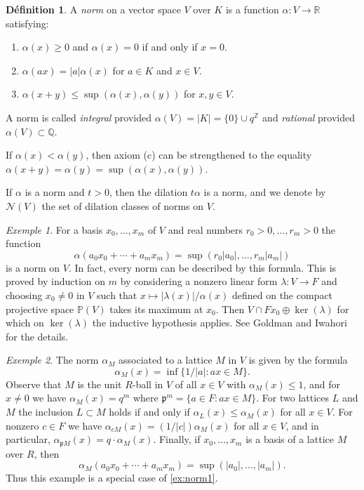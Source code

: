 \documentclass[12pt,a4paper]{article}
\theoremstyle{plain}
\theoremstyle{definition}
\newtheorem{definition}{D\'efinition}[section]
\theoremstyle{remark}
\newtheorem{example}{Exemple}[section]
\newcommand{\fp}{\mathfrak{p}}
\newcommand{\bQ}{\mathbb{Q}}
\newcommand{\bZ}{\mathbb{Z}}
\newcommand{\bP}{\mathbb{P}}
\newcommand{\bR}{\mathbb{R}}
\newcommand{\cN}{\mathcal{N}}
\providecommand{\cN}{\mathcal{N}}
\providecommand{\fp}{\mathfrak{p}}
\begin{document}
\begin{definition}
\label{def:norm}
A \emph{norm} on a vector space $V$ over $K$ is a function $\alpha: V \to \bR$ satisfying:
\begin{enumerate}[label=(\alph*)]
\item $\alpha(x) \geq 0$ and $\alpha(x) = 0$ if and only if $x = 0$.
\item $\alpha(ax) = |a| \alpha(x)$ for $a \in K$ and $x \in V$.
\item $\alpha(x+y) \leq \sup(\alpha(x), \alpha(y))$ for $x, y \in V$.
\end{enumerate}
A norm is called \emph{integral} provided $\alpha(V) = |K| = \{0\} \cup q^{\bZ}$ and \emph{rational} provided $\alpha(V) \subset \bQ$.
\end{definition}

If $\alpha(x) < \alpha(y)$, then axiom (c) can be strengthened to the equality $\alpha(x+y) = \alpha(y) = \sup(\alpha(x), \alpha(y))$.

If $\alpha$ is a norm and $t > 0$, then the dilation $t\alpha$ is a norm, and we denote by $\cN(V)$ the set of dilation classes of norms on $V$.

\begin{example}
\label{ex:norm1}
For a basis $x_0, \ldots, x_m$ of $V$ and real numbers $r_0 > 0, \ldots, r_m > 0$ the function
\[
\alpha(a_0 x_0 + \cdots + a_m x_m) = \sup(r_0 |a_0|, \ldots, r_m |a_m|)
\]
is a norm on $V$. In fact, every norm can be described by this formula. This is proved by induction on $m$ by considering a nonzero linear form $\lambda: V \to F$ and choosing $x_0 \neq 0$ in $V$ such that $x \mapsto |\lambda(x)|/\alpha(x)$ defined on the compact projective space $\bP(V)$ takes its maximum at $x_0$. Then $V \cap Fx_0 \oplus \ker(\lambda)$ for which on $\ker(\lambda)$ the inductive hypothesis applies. See Goldman and Iwahori for the details.
\end{example}

\begin{example}
\label{ex:norm2}
The norm $\alpha_M$ associated to a lattice $M$ in $V$ is given by the formula
\[
\alpha_M(x) = \inf\{1/|a| : ax \in M\}.
\]
Observe that $M$ is the unit $R$-ball in $V$ of all $x \in V$ with $\alpha_M(x) \leq 1$, and for $x \neq 0$ we have $\alpha_M(x) = q^m$ where $\fp^m = \{a \in F : ax \in M\}$. For two lattices $L$ and $M$ the inclusion $L \subset M$ holds if and only if $\alpha_L(x) \leq \alpha_M(x)$ for all $x \in V$. For nonzero $c \in F$ we have $\alpha_{cM}(x) = (1/|c|)\alpha_M(x)$ for all $x \in V$, and in particular, $\alpha_{\fp M}(x) = q \cdot \alpha_M(x)$. Finally, if $x_0, \ldots, x_m$ is a basis of a lattice $M$ over $R$, then
\[
\alpha_M(a_0 x_0 + \cdots + a_m x_m) = \sup(|a_0|, \ldots, |a_m|).
\]
Thus this example is a special case of \eqref{ex:norm1}.
\end{example}
\end{document}
